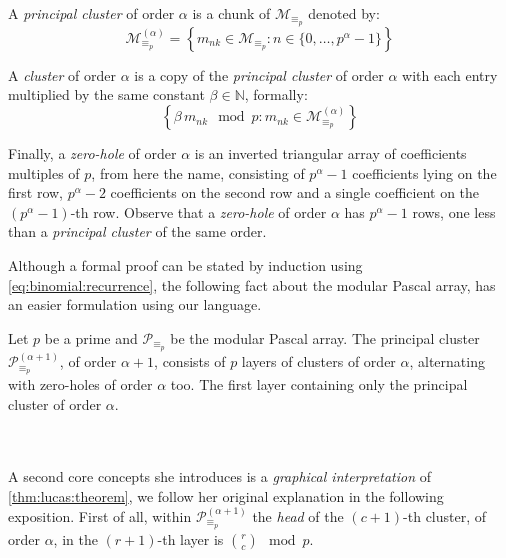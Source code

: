 A \emph{principal cluster} of order $\alpha$ is a chunk of $\mathcal{M}_{\equiv_{p}}$ denoted by:
\begin{displaymath}
    \mathcal{M}_{\equiv_{p}}^{(\alpha)} = 
        \left\lbrace m_{nk}\in \mathcal{M}_{\equiv_{p}}: n\in\lbrace 0,\ldots,p^{\alpha}-1\rbrace\right\rbrace
\end{displaymath}

A \emph{cluster} of order $\alpha$ is a copy of the \emph{principal cluster}
of order $\alpha$ with each entry multiplied 
by the same constant $\beta\in\mathbb{N}$, formally:
\begin{displaymath}
    \left\lbrace \beta\,m_{nk}\mod p:m_{nk}\in \mathcal{M}_{\equiv_{p}}^{(\alpha)}\right\rbrace
\end{displaymath}

Finally, a \emph{zero-hole} of order $\alpha$ is an inverted triangular array of
coefficients multiples of $p$, from here the name, consisting of $p^{\alpha}-1$
coefficients lying on the first row, $p^{\alpha}-2$ coefficients on the second row
and a single coefficient on the $(p^{\alpha}-1)$-th row. 
Observe that a \emph{zero-hole} of order $\alpha$ has $p^{\alpha}-1$ rows, one less
than a \emph{principal cluster} of the same order.

Although a formal proof can be stated by induction using \autoref{eq:binomial:recurrence},
the following fact about the modular Pascal array, has an easier formulation
using our language.

\begin{theorem}
    Let $p$ be a prime and $\mathcal{P}_{\equiv_{p}}$ be the 
    modular Pascal array. The principal cluster $\mathcal{P}_{\equiv_{p}}^{(\alpha+1)}$,
    of order $\alpha + 1$, consists of $p$ layers of clusters of order $\alpha$, alternating
    with zero-holes of order $\alpha$ too. The first layer containing only the principal
    cluster of order $\alpha$.
\end{theorem}
\quad
\\\\
A second core concepts she introduces is a \emph{graphical interpretation} of
\autoref{thm:lucas:theorem}, we follow her original explanation in the
following exposition.  First of all, within
$\mathcal{P}_{\equiv_{p}}^{(\alpha+1)}$ the \emph{head} of the $(c+1)$-th cluster,
of order $\alpha$, in the $(r+1)$-th layer is ${{r}\choose{c}}\mod p$.

